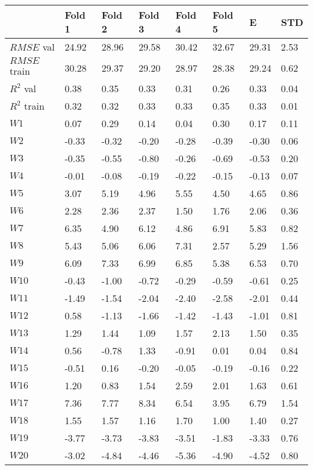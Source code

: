 \documentclass{article}
\begin{document}
\begin{longtable}{llllllll}
    \toprule
            &	Fold 1  &   Fold 2 & Fold 3  & Fold 4 & Fold 5   & E & STD   \\
    \midrule
	$RMSE$ val	&	24.92	&	28.96	&	29.58	&	30.42	&	32.67	&	29.31	&	2.53	\\
	$RMSE$ train	&	30.28	&	29.37	&	29.20	&	28.97	&	28.38	&	29.24	&	0.62	\\
	$R^2$ val	&	0.38	&	0.35	&	0.33	&	0.31	&	0.26	&	0.33	&	0.04	\\
	$R^2$ train	&	0.32	&	0.32	&	0.33	&	0.33	&	0.35	&	0.33	&	0.01	\\
	$W1$	&	0.07	&	0.29	&	0.14	&	0.04	&	0.30	&	0.17	&	0.11	\\
	$W2$	&	-0.33	&	-0.32	&	-0.20	&	-0.28	&	-0.39	&	-0.30	&	0.06	\\
	$W3$	&	-0.35	&	-0.55	&	-0.80	&	-0.26	&	-0.69	&	-0.53	&	0.20	\\
	$W4$	&	-0.01	&	-0.08	&	-0.19	&	-0.22	&	-0.15	&	-0.13	&	0.07	\\
	$W5$	&	3.07	&	5.19	&	4.96	&	5.55	&	4.50	&	4.65	&	0.86	\\
	$W6$	&	2.28	&	2.36	&	2.37	&	1.50	&	1.76	&	2.06	&	0.36	\\
	$W7$	&	6.35	&	4.90	&	6.12	&	4.86	&	6.91	&	5.83	&	0.82	\\
	$W8$	&	5.43	&	5.06	&	6.06	&	7.31	&	2.57	&	5.29	&	1.56	\\
	$W9$	&	6.09	&	7.33	&	6.99	&	6.85	&	5.38	&	6.53	&	0.70	\\
	$W10$	&	-0.43	&	-1.00	&	-0.72	&	-0.29	&	-0.59	&	-0.61	&	0.25	\\
	$W11$	&	-1.49	&	-1.54	&	-2.04	&	-2.40	&	-2.58	&	-2.01	&	0.44	\\
	$W12$	&	0.58	&	-1.13	&	-1.66	&	-1.42	&	-1.43	&	-1.01	&	0.81	\\
	$W13$	&	1.29	&	1.44	&	1.09	&	1.57	&	2.13	&	1.50	&	0.35	\\
	$W14$	&	0.56	&	-0.78	&	1.33	&	-0.91	&	0.01	&	0.04	&	0.84	\\
	$W15$	&	-0.51	&	0.16	&	-0.20	&	-0.05	&	-0.19	&	-0.16	&	0.22	\\
	$W16$	&	1.20	&	0.83	&	1.54	&	2.59	&	2.01	&	1.63	&	0.61	\\
	$W17$	&	7.36	&	7.77	&	8.34	&	6.54	&	3.95	&	6.79	&	1.54	\\
	$W18$	&	1.55	&	1.57	&	1.16	&	1.70	&	1.00	&	1.40	&	0.27	\\
	$W19$	&	-3.77	&	-3.73	&	-3.83	&	-3.51	&	-1.83	&	-3.33	&	0.76	\\
	$W20$	&	-3.02	&	-4.84	&	-4.46	&	-5.36	&	-4.90	&	-4.52	&	0.80	\\

\end{longtable}
\end{document}
